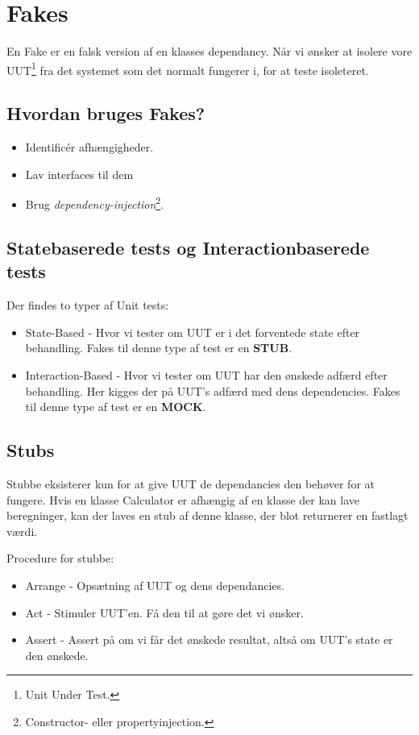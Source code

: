 \section{Fakes}

En Fake er en falsk version af en klasses dependancy. Når vi ønsker at isolere vore UUT\footnote{Unit Under Test.} fra det systemet som det normalt fungerer i, for at teste isoleteret.

\subsection{Hvordan bruges Fakes?}

\begin{itemize}
	\item Identificér afhængigheder.
	\item Lav interfaces til dem
	\item Brug \textit{dependency-injection}\footnote{Constructor- eller propertyinjection.}.
\end{itemize}

\subsection{Statebaserede tests og Interactionbaserede tests}
Der findes to typer af Unit tests:

\begin{itemize}
	\item State-Based - Hvor vi tester om UUT er i det forventede state efter behandling. Fakes til denne type af test er en \textbf{STUB}.
	\item Interaction-Based - Hvor vi tester om UUT har den ønskede adfærd efter behandling. Her kigges der på UUT's adfærd med dens dependencies. Fakes til denne type af test er en \textbf{MOCK}.
\end{itemize}

\subsection{Stubs}
Stubbe eksisterer kun for at give UUT de dependancies den behøver for at fungere.
Hvis en klasse Calculator er afhængig af en klasse der kan lave beregninger, kan der laves en stub af denne klasse, der blot returnerer en fastlagt værdi. 

Procedure for stubbe:
\begin{itemize}
	\item Arrange - Opsætning af UUT og dens dependancies.
	\item Act - Stimuler UUT'en. Få den til at gøre det vi ønsker.
	\item Assert - Assert på om vi får det ønskede resultat, altså om UUT's state er den ønskede.
\end{itemize}

